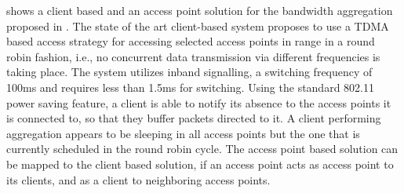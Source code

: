 
 shows a client based and an access point solution for the bandwidth aggregation proposed in \cite{goma2013patent}.
The state of the art client-based system proposes to use a TDMA based access strategy for accessing selected access points in range in a round robin fashion, i.e., no concurrent data transmission via different frequencies is taking place.
The system utilizes inband signalling, a switching frequency of 100ms and requires less than 1.5ms for switching.
Using the standard 802.11 power saving feature, a client is able to notify its absence to the access points it is connected to, so that they buffer packets directed to it.
A client performing aggregation appears to be sleeping in all access points but the one that is currently scheduled in the round robin cycle.
The access point based solution can be mapped to the client based solution, if an access point acts as access point to its clients, and as a client to neighboring access points.

